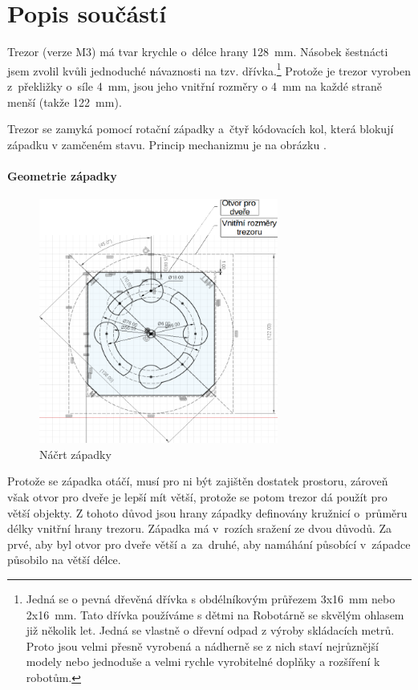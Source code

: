 \section{Popis součástí}

Trezor (verze M3)
 má tvar krychle o~délce hrany 128~mm. Násobek šestnácti jsem zvolil kvůli jednoduché návaznosti na tzv. dřívka.\footnote{
Jedná se o pevná dřevěná dřívka s obdélníkovým průřezem 3x16~mm nebo 2x16~mm. 
    Tato dřívka používáme s dětmi na Robotárně se skvělým ohlasem již několik let. 
    Jedná se vlastně o dřevní odpad z výroby skládacích metrů. Proto jsou velmi přesně vyrobená a nádherně se z nich staví nejrůznější modely nebo jednoduše a velmi rychle vyrobitelné doplňky a rozšíření k robotům.}
Protože je trezor vyroben z~překližky o~síle 4~mm, jsou jeho vnitřní rozměry o 4~mm na každé straně menší (takže 122~mm).

Trezor se zamyká pomocí rotační západky a~čtyř kódovacích kol, která blokují západku v zamčeném stavu. 
Princip mechanizmu je na obrázku .

\paragraph{Geometrie západky}
\begin{figure}[h]
	\centering
    \includegraphics[width=0.7\textwidth]{kapitoly/obrazky/M3/geometrie_zapadky.png}
    \caption{Náčrt západky}
    \label{fig:M3-geometrie-zapadky}
\end{figure} 

Protože se západka otáčí, musí pro ni být zajištěn dostatek prostoru, zároveň však otvor pro dveře je lepší mít větší, protože se potom trezor dá použít pro větší objekty.
Z tohoto důvod jsou hrany západky definovány kružnicí o~průměru délky vnitřní hrany trezoru. Západka má v~rozích sražení ze dvou důvodů. Za prvé, aby byl otvor pro
dveře větší a~za~druhé, aby namáhání působící v~západce působilo na větší délce.

